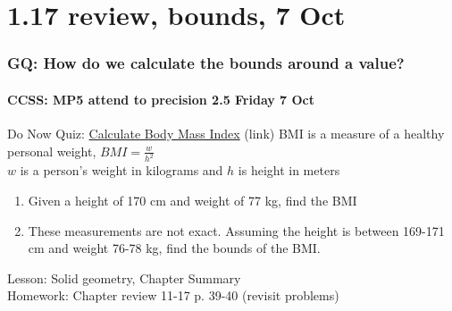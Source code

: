 \documentclass{beamer}
\begin{document}
  \section{1.17 review, bounds, 7 Oct}
  \frame
  {
    \frametitle{GQ: How do we calculate the bounds around a value?}
    \framesubtitle{CCSS: MP5 attend to precision \hfill \alert{2.5 Friday 7 Oct}}

    \begin{block}{Do Now Quiz: \href{https://www.smartbmicalculator.com/}{Calculate Body Mass Index} (link)}
      BMI is a measure of a healthy personal weight, $\displaystyle BMI = \frac{w}{h^2}$ \\ \smallskip
      $w$ is a person's weight in kilograms and $h$ is height in meters
      \begin{enumerate} 
          \item Given a height of 170 cm and weight of 77 kg, find the BMI
          \item These measurements are not exact. Assuming the height is between 169-171 cm and weight 76-78 kg, find the bounds of the BMI.
       \end{enumerate}
      \end{block}
    Lesson: Solid geometry, Chapter Summary\\ \smallskip
    Homework: Chapter review 11-17 p. 39-40 (revisit problems)
  }
\end{document}
